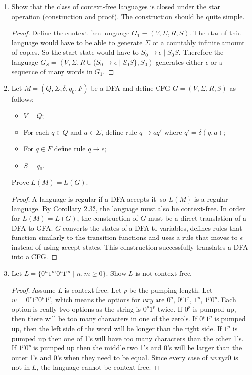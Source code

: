 \documentclass{article}
\begin{document}
\begin{enumerate}
        \item Show that the class of context-free languages is closed under the star operation (construction and proof). The construction should be quite simple.
            \begin{proof}
                Define the context-free language $G_1=(V, \Sigma, R, S)$. The star of this language would have to be able to generate $\Sigma$ or a countably infinite amount of copies. So the start state would have to $S_0\rightarrow \epsilon \mid S_0S$. Therefore the language $G_S=(V, \Sigma, R \cup \{S_0\rightarrow\epsilon\mid S_0S\}, S_0)$ generates either $\epsilon$ or a sequence of many words in $G_1$.
            \end{proof}
        \item Let $M=(Q,\Sigma, \delta, q_0, F)$ be a DFA and define CFG $G=(V,\Sigma,R,S)$ as follows:
            \begin{itemize}
                \item $V = Q$;
                \item For each $q\in Q$ and $ a\in \Sigma $, define rule $q\rightarrow aq'$ where $q'=\delta(q,a)$;
                \item For $q\in F$ define rule $q\rightarrow\epsilon$;
                \item $S=q_0$.
            \end{itemize}
            Prove $L(M) = L(G)$.
            \begin{proof}
                A language is regular if a DFA accepts it, so $L(M)$ is a regular language. By Corollary 2.32, the language must also be context-free. In order for $L(M) = L(G)$, the construction of $G$ must be a direct translation of a DFA to GFA. $G$ converts the states of a DFA to variables, defines rules that function similarly to the transition functions and uses a rule that moves to $\epsilon$ instead of using accept states. This construction successfully translates a DFA into a CFG.
            \end{proof}
        \item Let $L=\{0^n1^m0^n1^m \mid n,m \geq 0\}$. Show $L$ is not context-free.
            \begin{proof}
                Assume $L$ is context-free. Let $p$ be the pumping length. Let $w=0^p1^p0^p1^p$, which means the options for $vxy$ are $0^p$, $0^p1^p$, $1^p$, $1^p0^p$. Each option is really two options as the string is $0^p1^p$ twice. If $0^p$ is pumped up, then there will be too many characters in one of the zero's. If $0^p1^p$ is pumped up, then the left side of the word will be longer than the right side. If $1^p$ is pumped up then one of 1's will have too many characters than the other 1's. If $1^p0^p$ is pumped up then the middle two 1's and 0's will be larger than the outer 1's and 0's when they need to be equal. Since every case of $uvxyz0$ is not in $L$, the language cannot be context-free. 

\end{proof}
\end{enumerate}
\end{document}
